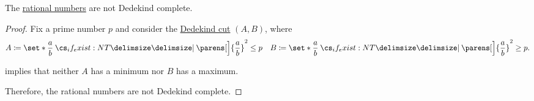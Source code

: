 \begin{proposition}\label{thm:rational_numbers_not_dedekind_complete}
  The \hyperref[def:rational_numbers]{rational numbers} are not Dedekind complete.
\end{proposition}
\begin{proof}
  Fix a prime number \( p \) and consider the \hyperref[def:dedekind_cut]{Dedekind cut} \( (A, B) \), where
  \begin{align*}
    A \coloneqq \set*{ \frac a b \given* \parens[\Big]{ \frac a b }^2 \leq p }
    &&
    B \coloneqq \set*{ \frac a b \given* \parens[\Big]{ \frac a b }^2 \geq p }.
  \end{align*}

   implies that neither \( A \) has a minimum nor \( B \) has a maximum.

  Therefore, the rational numbers are not Dedekind complete.
\end{proof}
